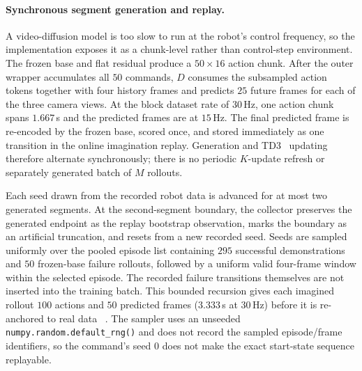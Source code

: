 \documentclass[letterpaper]{article} %
\begin{document}
\paragraph{Synchronous segment generation and replay.}
A video-diffusion model is too slow to run at the robot's control frequency,
so the implementation exposes it as a chunk-level rather than control-step
environment. The frozen base and flat residual produce a $50\times16$ action
chunk. After the outer wrapper accumulates all $50$ commands, $D$ consumes the
subsampled action tokens together with four history frames and predicts $25$
future frames for each of the three camera views. At the block dataset rate of
$30$\,Hz, one action chunk spans $1.667$\,s and the predicted frames are at
$15$\,Hz. The final predicted frame is re-encoded by the frozen base, scored
once, and stored immediately as one transition in the online imagination
replay. Generation and TD3~\cite{fujimoto2018addressing} updating therefore
alternate synchronously; there is no periodic $K$-update refresh or separately
generated batch of $M$ rollouts.

Each seed drawn from the recorded robot data is advanced for at most two
generated segments. At the second-segment boundary, the collector preserves the
generated endpoint as the replay bootstrap observation, marks the boundary as an
artificial truncation, and resets from a new recorded seed. Seeds are sampled
uniformly over the pooled episode list containing $295$ successful
demonstrations and $50$ frozen-base failure rollouts, followed by a uniform
valid four-frame window within the selected episode. The recorded failure
transitions themselves are not inserted into the training batch. This bounded
recursion gives each imagined rollout $100$ actions and $50$ predicted frames
($3.333$\,s at $30$\,Hz) before it is re-anchored to real data
~\cite{janner2019mbpo}. The sampler uses an unseeded
\texttt{numpy.random.default\_rng()} and does not record the sampled
episode/frame identifiers, so the command's seed $0$ does not make the exact
start-state sequence replayable.
\end{document}
